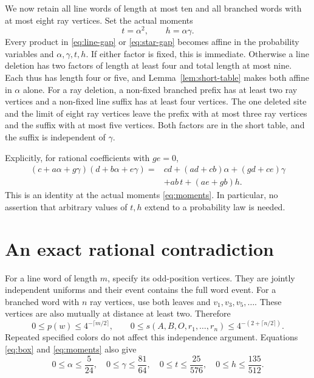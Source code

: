 \documentclass[11pt]{article}
\begin{document}
We now retain all line words of length at most ten and all branched words
with at most eight ray vertices. Set the actual moments
\begin{equation}\label{eq:moments}
t=\alpha^2,\qquad h=\alpha\gamma.
\end{equation}
Every product in \eqref{eq:line-gap} or \eqref{eq:star-gap} becomes affine in
the probability variables and $\alpha,\gamma,t,h$. If either factor is fixed,
this is immediate. Otherwise a line deletion has two factors of length at
least four and total length at most nine. Each thus has length four or five,
and Lemma~\ref{lem:short-table} makes both affine in $\alpha$ alone.
For a ray deletion, a non-fixed branched prefix has at least two ray
vertices and a non-fixed line suffix has at least four vertices. The one
deleted site and the limit of eight ray vertices leave the prefix with at
most three ray vertices and the suffix with at most five vertices. Both
factors are in the short table, and the suffix is independent of $\gamma$.

Explicitly, for rational coefficients with $ge=0$,
\begin{align*}
(c+a\alpha+g\gamma)(d+b\alpha+e\gamma)
={}&cd+(ad+cb)\alpha+(gd+ce)\gamma\\
&+ab\,t+(ae+gb)h.
\end{align*}
This is an identity at the actual moments \eqref{eq:moments}. In particular,
no assertion that arbitrary values of $t,h$ extend to a probability law is
needed.

\section{An exact rational contradiction}\label{sec:certificate}
For a line word of length $m$, specify its odd-position vertices. They are
jointly independent uniforms and their event contains the full word event.
For a branched word with $n$ ray vertices, use both leaves and
$v_1,v_3,v_5,\ldots$. These vertices are also mutually at distance at least
two. Therefore
\begin{equation}\label{eq:independent-upper}
0\leq p(w)\leq4^{-\lceil m/2\rceil},\qquad
0\leq s(A,B,O,r_1,\ldots,r_n)\leq4^{-(2+\lceil n/2\rceil)}.
\end{equation}
Repeated specified colors do not affect this independence argument.
Equations \eqref{eq:box} and \eqref{eq:moments} also give
\begin{equation}\label{eq:moment-upper}
0\leq\alpha\leq\frac5{24},\quad
0\leq\gamma\leq\frac{81}{64},\quad
0\leq t\leq\frac{25}{576},\quad
0\leq h\leq\frac{135}{512}.
\end{equation}
\end{document}
